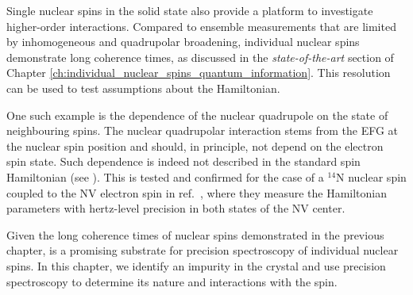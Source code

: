 Single nuclear spins in the solid state also provide a platform to investigate higher-order interactions. Compared to ensemble measurements that are limited by inhomogeneous and quadrupolar broadening, individual nuclear spins demonstrate long coherence times, as discussed in the \textit{state-of-the-art} section of Chapter \ref{ch:individual_nuclear_spins_quantum_information}. This resolution can be used to test assumptions about the Hamiltonian.

One such example is the dependence of the nuclear quadrupole on the state of neighbouring spins. The nuclear quadrupolar interaction stems from the EFG at the nuclear spin position and should, in principle, not depend on the electron spin state. Such dependence is indeed not described in the standard spin Hamiltonian (see ). This is tested and confirmed for the case of a $^{14}$N nuclear spin coupled to the NV electron spin in ref.~, where they measure the Hamiltonian parameters with hertz-level precision in both states of the NV center. 

Given the long coherence times of \W nuclear spins demonstrated in the previous chapter, \Ca is a promising substrate for precision spectroscopy of individual nuclear spins. In this chapter, we identify an impurity in the crystal and use precision spectroscopy to determine its nature and interactions with the \Er spin.



